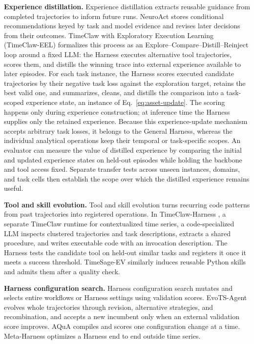 \documentclass[preprints,article,submit,moreauthors]{Definitions/mdpi}
\begin{document}
\noindent\textbf{Experience distillation.} Experience distillation extracts reusable guidance from completed trajectories to inform future runs. NeuroAct \citep{neuroact2026} stores conditional recommendations keyed by task and model evidence and revises later decisions from their outcomes. TimeClaw with Exploratory Execution Learning (TimeClaw-EEL) \citep{timeclaw2026explore} formalizes this process as an Explore--Compare--Distill--Reinject loop around a fixed LLM: the Harness executes alternative tool trajectories, scores them, and distills the winning trace into external experience available to later episodes. For each task instance, the Harness scores executed candidate trajectories by their negative task loss against the exploration target, retains the best valid one, and summarizes, cleans, and distills the comparison into a task-scoped experience state, an instance of Eq.~\eqref{eq:asset-update}. The scoring happens only during experience construction; at inference time the Harness supplies only the retained experience.
Because this experience-update mechanism accepts arbitrary task losses, it belongs to the General Harness, whereas the individual analytical operations keep their temporal or task-specific scopes. An evaluator can measure the value of distilled experience by comparing the initial and updated experience states on held-out episodes while holding the backbone and tool access fixed. Separate transfer tests across unseen instances, domains, and task cells then establish the scope over which the distilled experience remains useful.

\noindent\textbf{Tool and skill evolution.} Tool and skill evolution turns recurring code patterns from past trajectories into registered operations. In TimeClaw-Harness \citep{timeclaw2026harness}, a separate TimeClaw runtime for contextualized time series, a code-specialized LLM inspects clustered trajectories and task descriptions, extracts a shared procedure, and writes executable code with an invocation description. The Harness tests the candidate tool on held-out similar tasks and registers it once it meets a success threshold. TimeSage-EV \citep{timesageev2026} similarly induces reusable Python skills and admits them after a quality check.

\noindent\textbf{Harness configuration search.} Harness configuration search mutates and selects entire workflows or Harness settings using validation scores. EvoTS-Agent \citep{evotsagent2026} evolves whole trajectories through revision, alternative strategies, and recombination, and accepts a new incumbent only when an external validation score improves. AQuA \citep{aqua2026} compiles and scores one configuration change at a time. Meta-Harness \citep{lee2026metaharness} optimizes a Harness end to end outside time series.
\end{document}
